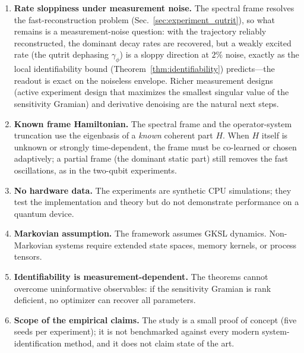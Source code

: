 \documentclass[11pt]{article}
\begin{document}
\begin{enumerate}[leftmargin=1.5em]
    \item \textbf{Rate sloppiness under measurement noise.} The spectral frame resolves the fast-reconstruction problem (Sec.~\ref{sec:experiment_qutrit}), so what remains is a measurement-noise question: with the trajectory reliably reconstructed, the dominant decay rates are recovered, but a weakly excited rate (the qutrit dephasing $\gamma_\phi$) is a sloppy direction at $2\%$ noise, exactly as the local identifiability bound (Theorem~\ref{thm:identifiability}) predicts---the readout is exact on the noiseless envelope. Richer measurement designs (active experiment design that maximizes the smallest singular value of the sensitivity Gramian) and derivative denoising are the natural next steps.
    \item \textbf{Known frame Hamiltonian.} The spectral frame and the operator-system truncation use the eigenbasis of a \emph{known} coherent part $H$. When $H$ itself is unknown or strongly time-dependent, the frame must be co-learned or chosen adaptively; a partial frame (the dominant static part) still removes the fast oscillations, as in the two-qubit experiments.
    \item \textbf{No hardware data.} The experiments are synthetic CPU simulations; they test the implementation and theory but do not demonstrate performance on a quantum device.
    \item \textbf{Markovian assumption.} The framework assumes GKSL dynamics. Non-Markovian systems require extended state spaces, memory kernels, or process tensors.
    \item \textbf{Identifiability is measurement-dependent.} The theorems cannot overcome uninformative observables: if the sensitivity Gramian is rank deficient, no optimizer can recover all parameters.
    \item \textbf{Scope of the empirical claims.} The study is a small proof of concept (five seeds per experiment); it is not benchmarked against every modern system-identification method, and it does not claim state of the art.
\end{enumerate}
\end{document}
